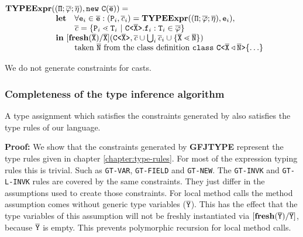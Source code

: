 \documentclass[a4paper,USenglish,cleveref, autoref, thm-restate]{lipics-v2021}
\begin{document}
\noindent
$\begin{array}{@{}l@{}l}
\typeExpr &(\typeAssumptions, \mathtt{new }\ \texttt{C}(\overline{\texttt{e}}) ) = \\
&\begin{array}{ll}
\textbf{let} %
& \forall \texttt{e}_i \in \overline{\texttt{e}} : (\type{P}_i, \constraints_i) = \typeExpr(\typeAssumptions, \texttt{e}_i)  ,\\
& \constraints = \{ \type{P}_i \lessdot \type{T}_i \ | \ \exptype{C}{\ol{X}}.\texttt{f}_i : \type{T}_i \in \ol{\fieldAssumption} \}\\
\multicolumn{2}{l}{\mathbf{in}\ [\textbf{fresh}(\ol{X})/\ol{X}](\exptype{C}{\ol{X}}, \constraints \cup \bigcup_i \constraints_i \cup \set{\ol{X} \lessdot \ol{N}}) }\\
& \text{taken } \ol{\type{N}}\ \text{from the class definition}\ \texttt{class}\ \exptype{C}{\ol{X} \triangleleft \ol{N}} \set{\ldots} \\
\end{array}
\end{array}
$

We do not generate constraints for casts.

\subsubsection{Completeness of the type inference algorithm}
\begin{theoremAndi}
  A type assignment which satisfies the constraints generated by \FGJType also satisfies the type rules of our \TFGJ language.
\end{theoremAndi}
\textbf{Proof:}
We show that the constraints generated by \textbf{GFJTYPE}
represent the type rules given in chapter \ref{chapter:type-rules}.
For most of the expression typing rules this is trivial.
Such as \texttt{GT-VAR}, \texttt{GT-FIELD} and \texttt{GT-NEW}.
The \texttt{GT-INVK} and \texttt{GT-L-INVK} rules are covered by the same constraints.
They just differ in the assumptions used to create those constraints.
For local method calls the method assumption comes without generic type variables ($\mathtt{\overline{\tt Y}}$).
This has the effect that the type variables of this assumption will not be freshly instantiated
via $\mathtt{[\textbf{fresh}(\overline{\tt Y})/\overline{\tt Y}]}$, because $\mathtt{\overline{\tt Y}}$ is empty.
This prevents polymorphic recursion for local method calls.
\end{document}
